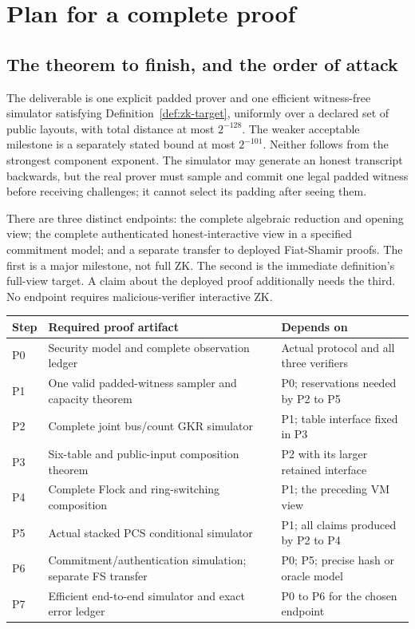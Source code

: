 \section{Plan for a complete proof}\label{sec:zk-remaining}

\subsection{The theorem to finish, and the order of attack}

The deliverable is one explicit padded prover and one efficient witness-free simulator satisfying Definition~\ref{def:zk-target}, uniformly over a declared set of public layouts, with total distance at most $2^{-128}$. The weaker acceptable milestone is a separately stated bound at most $2^{-101}$. Neither follows from the strongest component exponent. The simulator may generate an honest transcript backwards, but the real prover must sample and commit one legal padded witness before receiving challenges; it cannot select its padding after seeing them.

There are three distinct endpoints: the complete algebraic reduction and opening view; the complete authenticated honest-interactive view in a specified commitment model; and a separate transfer to deployed Fiat-Shamir proofs. The first is a major milestone, not full ZK. The second is the immediate definition's full-view target. A claim about the deployed proof additionally needs the third. No endpoint requires malicious-verifier interactive ZK.

\begin{center}
\small
\begin{tabular}{@{}p{.08\linewidth}p{.48\linewidth}p{.34\linewidth}@{}}
\toprule
Step & Required proof artifact & Depends on \\
\midrule
P0 & Security model and complete observation ledger & Actual protocol and all three verifiers \\
P1 & One valid padded-witness sampler and capacity theorem & P0; reservations needed by P2 to P5 \\
P2 & Complete joint bus/count GKR simulator & P1; table interface fixed in P3 \\
P3 & Six-table and public-input composition theorem & P2 with its larger retained interface \\
P4 & Complete Flock and ring-switching composition & P1; the preceding VM view \\
P5 & Actual stacked PCS conditional simulator & P1; all claims produced by P2 to P4 \\
P6 & Commitment/authentication simulation; separate FS transfer & P0; P5; precise hash or oracle model \\
P7 & Efficient end-to-end simulator and exact error ledger & P0 to P6 for the chosen endpoint \\
\bottomrule
\end{tabular}
\end{center}


